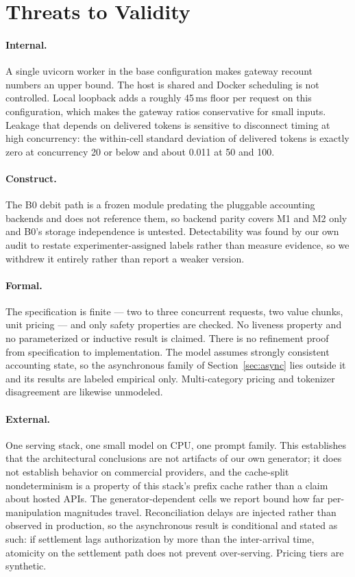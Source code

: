 \documentclass[preprint,3p,authoryear,12pt]{elsarticle}
\begin{document}
\section{Threats to Validity}
\label{sec:limits}
\paragraph{Internal.}
A single uvicorn worker in the base configuration makes gateway recount numbers an upper
bound. The host is shared and Docker scheduling is not controlled. Local loopback adds a
roughly 45\,ms floor per request on this configuration, which makes the gateway ratios
conservative for small inputs. Leakage that depends on delivered tokens is sensitive to
disconnect timing at high concurrency: the within-cell standard deviation of delivered
tokens is exactly zero at concurrency 20 or below and about 0.011 at 50 and 100.

\paragraph{Construct.}
The B0 debit path is a frozen module predating the pluggable accounting backends and
does not reference them, so backend parity covers M1 and M2 only and B0's storage
independence is untested. Detectability was found by our own audit to restate
experimenter-assigned labels rather than measure evidence, so we withdrew it entirely
rather than report a weaker version.

\paragraph{Formal.}
The specification is finite --- two to three concurrent requests, two value chunks, unit
pricing --- and only safety properties are checked. No liveness property and no
parameterized or inductive result is claimed. There is no refinement proof from
specification to implementation. The model assumes strongly consistent accounting state,
so the asynchronous family of Section~\ref{sec:async} lies outside it and its results are
labeled empirical only. Multi-category pricing and tokenizer disagreement are likewise
unmodeled.

\paragraph{External.}
One serving stack, one small model on CPU, one prompt family. This establishes that the
architectural conclusions are not artifacts of our own generator; it does not establish
behavior on commercial providers, and the cache-split nondeterminism is a property of
this stack's prefix cache rather than a claim about hosted APIs. The generator-dependent
cells we report bound how far per-manipulation magnitudes travel. Reconciliation delays
are injected rather than observed in production, so the asynchronous result is
conditional and stated as such: if settlement lags authorization by more than the
inter-arrival time, atomicity on the settlement path does not prevent over-serving.
Pricing tiers are synthetic.
\end{document}
